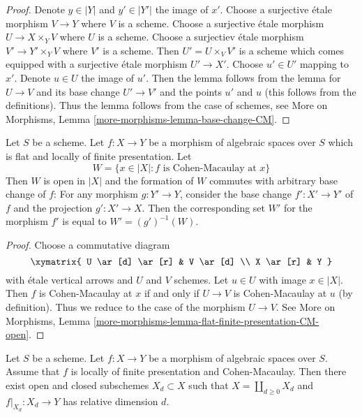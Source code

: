 \begin{proof}
Denote $y \in |Y|$ and $y' \in |Y'|$ the image of $x'$.
Choose a surjective \'etale morphism $V \to Y$ where $V$ is a scheme.
Choose a surjective \'etale morphism $U \to X \times_Y V$ where
$U$ is a scheme.
Choose a surjectiev \'etale morphism $V' \to Y' \times_Y V$
where $V'$ is a scheme.
Then $U' = U \times_V V'$ is a scheme which comes equipped
with a surjective \'etale morphism $U' \to X'$.
Choose $u' \in U'$ mapping to $x'$. Denote $u \in U$ the image of $u'$.
Then the lemma follows from the lemma for
$U \to V$ and its base change $U' \to V'$ and the
points $u'$ and $u$ (this follows from the definitions).
Thus the lemma follows from the case of schemes, see
More on Morphisms, Lemma \ref{more-morphisms-lemma-base-change-CM}.
\end{proof}

\begin{lemma}
\label{lemma-flat-finite-presentation-CM-open}
Let $S$ be a scheme.
Let $f : X \to Y$ be a morphism of algebraic spaces over $S$
which is flat and locally of finite presentation. Let
$$
W = \{x \in |X| : f\text{ is Cohen-Macaulay at }x\}
$$
Then $W$ is open in $|X|$ and the formation of $W$
commutes with arbitrary base change of $f$:
For any morphism $g : Y' \to Y$, consider
the base change $f' : X' \to Y'$ of $f$ and the
projection $g' : X' \to X$. Then the corresponding
set $W'$ for the morphism $f'$ is equal to $W' = (g')^{-1}(W)$.
\end{lemma}

\begin{proof}
Choose a commutative diagram
$$
\xymatrix{
U \ar[d] \ar[r] & V \ar[d] \\
X \ar[r] & Y
}
$$
with \'etale vertical arrows and $U$ and $V$ schemes.
Let $u \in U$ with image $x \in |X|$.
Then $f$ is Cohen-Macaulay at $x$ if and only if $U \to V$ is
Cohen-Macaulay at $u$ (by definition).
Thus we reduce to the case of the morphism $U \to V$.
See More on Morphisms, Lemma
\ref{more-morphisms-lemma-flat-finite-presentation-CM-open}.
\end{proof}

\begin{lemma}
\label{lemma-lfp-CM-relative-dimension}
Let $S$ be a scheme. Let $f : X \to Y$ be a
morphism of algebraic spaces over $S$. Assume that
$f$ is locally of finite presentation and Cohen-Macaulay.
Then there exist open and closed subschemes $X_d \subset X$
such that $X = \coprod_{d \geq 0} X_d$ and $f|_{X_d} : X_d \to Y$
has relative dimension $d$.
\end{lemma}

